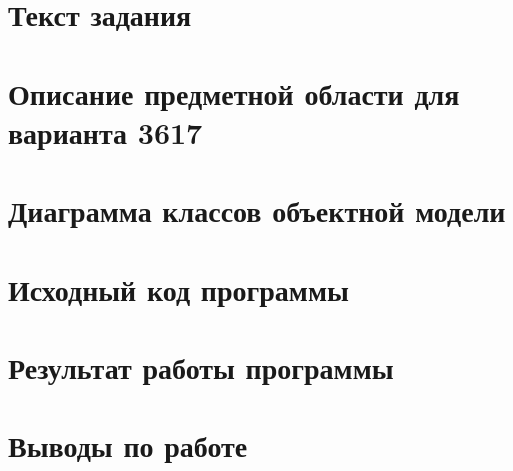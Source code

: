 \documentclass[a4paper, 11pt]{article}
\begin{document}


\tableofcontents
\vspace{2em}
\pagebreak{}

\section{Текст задания}

\pagebreak

\section{Описание предметной области для варианта 3617}

\pagebreak

\section{Диаграмма классов объектной модели}

\pagebreak

\section{Исходный код программы}


\section{Результат работы программы}

\section{Выводы по работе}

\end{document}
